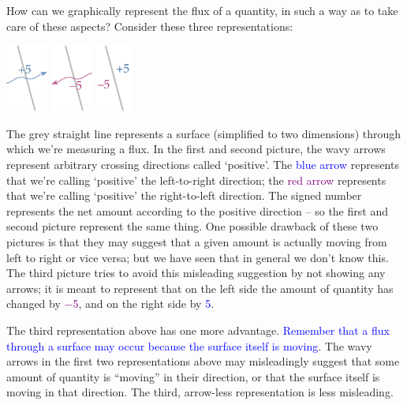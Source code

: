 \documentclass[a4paper,12pt,%
onecolumn,oneside,titlepage,%
british%
]{memoir}
\renewcommand*{\|}[1][]{\nonscript\:#1\vert\nonscript\:\mathopen{}}
\newcommand*{\sect}{\S}%
\renewcommand*{\autoref}[2]{\sidepar{\vspace{-1ex}\footnotesize{\color{blue}\faIcon{hand-point-right}\enspace\sect\,\ref{#1} p.\,\pageref{#1}}}\textcolor{blue}{#2}}
\begin{document}
How can we graphically represent the flux of a quantity, in such a way as to take care of these aspects? Consider these three representations:
\begin{center}\label{fig:scalar_fluxes}
\hspace*{\fill}\includegraphics[height=6em]{flux_plus5c.pdf}
\hfill\includegraphics[height=6em]{flux_minus5c.pdf}
\hfill\includegraphics[height=6em]{flux_minusplus5.pdf}
\hspace*{\fill}
\end{center}
The \textcolor{midgrey}{grey straight line} represents a surface (simplified to two dimensions) through which we're measuring a flux. In the first and second picture, the wavy arrows represent arbitrary crossing directions called \enquote*{positive}. The \textcolor{blue}{blue arrow} represents that we're calling \enquote*{positive} the left-to-right direction; the \textcolor{purple}{red arrow} represents that we're calling \enquote*{positive} the right-to-left direction. The signed number represents the net amount according to the positive direction -- so the first and second picture represent the same thing. One possible drawback of these two pictures is that they may suggest that a given amount is actually moving from left to right or vice versa; but we have seen that in general we don't know this.
The third picture tries to avoid this misleading suggestion by not showing any arrows; it is meant to represent that on the left side the amount of quantity has changed by \textcolor{purple}{\num{-5}}, and on the right side by \textcolor{blue}{\num{+5}}.

The third representation above has one more advantage. \autoref{sec:choice_surfaces}{Remember  that a flux through a surface may occur because the surface itself is moving}. The wavy arrows in the first two representations above may misleadingly suggest that some amount of quantity is \enquote{moving} in their direction, or that the surface itself is moving in that direction. The third, arrow-less representation is less misleading.
\end{document}
